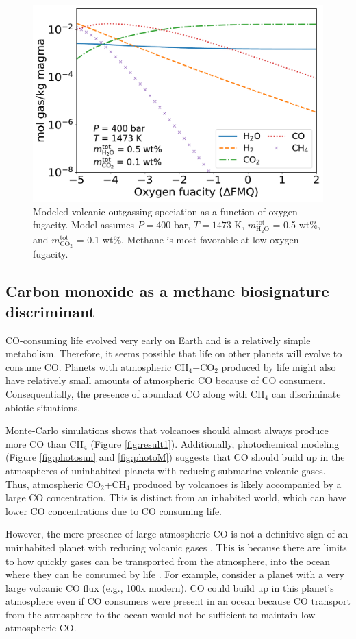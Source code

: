 \begin{figure}
    \centering
    \includegraphics[width=10 cm]{tex/3methane/figures/fO2_dependence.pdf}
    \caption{Modeled volcanic outgassing speciation as a function of oxygen fugacity. Model assumes $P=400$ bar, $T=1473$ K, $m_\mathrm{H_2O}^\mathrm{tot}$ = 0.5 wt\%, and $m_\mathrm{CO_2}^\mathrm{tot}$ = 0.1 wt\%. Methane is most favorable at low oxygen fugacity.}
    \label{fig:fO2}
\end{figure}

\subsection{Carbon monoxide as a methane biosignature discriminant} \label{sec:CO_disc}

CO-consuming life evolved very early on Earth \citep{Adam_2018} and is a relatively simple metabolism. Therefore, it seems possible that life on other planets will evolve to consume CO. Planets with atmospheric CH$_4$+CO$_2$ produced by life might also have relatively small amounts of atmospheric CO because of CO consumers. Consequentially, the presence of abundant CO along with CH$_4$ can discriminate abiotic situations.

Monte-Carlo simulations shows that volcanoes should almost always produce more CO than CH$_4$ (Figure \ref{fig:result1}). Additionally, photochemical modeling (Figure \ref{fig:photosun} and \ref{fig:photoM}) suggests that CO should build up in the atmospheres of uninhabited planets with reducing submarine volcanic gases. Thus, atmospheric CO$_2$+CH$_4$ produced by volcanoes is likely accompanied by a large CO concentration. This is distinct from an inhabited world, which can have lower CO concentrations due to CO consuming life. 

However, the mere presence of large atmospheric CO is not a definitive sign of an uninhabited planet with reducing volcanic gases \citep{Schwieterman_2019}. This is because there are limits to how quickly gases can be transported from the atmosphere, into the ocean where they can be consumed by life \citep{Kharecha_2005}. For example, consider a planet with a very large volcanic CO flux (e.g., 100x modern). CO could build up in this planet's atmosphere even if CO consumers were present in an ocean because CO transport from the atmosphere to the ocean would not be sufficient to maintain low atmospheric CO. 

